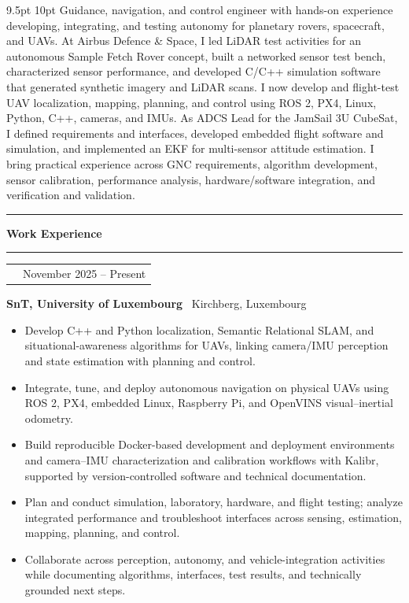 \documentclass[10pt,a4paper]{article}
\makeatletter
\newcommand{\StatementSize}{9.5pt}
\newcommand{\SectionSize}{11.5pt}
\newcommand{\RoleSize}{10.3pt}
\newcommand{\CompanySize}{9.6pt}
\newcommand{\DurationSize}{9pt}
\newcommand{\BodySize}{9.2pt}
\newcommand{\StatementLineSize}{10pt}
\newcommand{\SectionLineSize}{12pt}
\newcommand{\RoleLineSize}{11.5pt}
\newcommand{\CompanyLineSize}{10.8pt}
\newcommand{\DurationLineSize}{9pt}
\newcommand{\BodyLineSize}{11pt}
\newcommand{\HeaderAfter}{-5pt}
\newcommand{\StatementAfter}{4pt}
\newcommand{\SectionBefore}{4pt}
\newcommand{\SectionTitleToLine}{2pt}
\newcommand{\SectionLineToEntry}{0pt}
\newcommand{\EntryBefore}{0pt}
\newcommand{\RoleToCompany}{-5pt}
\newcommand{\CompanyToBullets}{3pt}
\newcommand{\EntryAfter}{6pt}
\newcommand{\BulletSpacing}{2pt}
\newcommand{\BulletBefore}{0pt}
\newcommand{\BulletIndent}{1.25em}
\newcommand{\SubsectionLineThickness}{0.4pt}
\newcommand{\CVLineThickness}{0.5pt}
\newcommand{\DurationWidth}{4.5cm}
\newcommand{\CVLine}{
    \vspace{\HeaderAfter}
    \noindent
    \textcolor{CVBlack}{
        \rule{\textwidth}{\CVLineThickness}
    }
    \vspace{\HeaderAfter}
}
\newcommand{\CVFirstSection}[1]{

    \vspace{\SectionBefore}


    {\fontsize{\SectionSize}{\SectionLineSize}
    \selectfont
    \textbf{\textcolor{CVBlack}{#1}}}

    \vspace{\SectionTitleToLine}


    \noindent
    \textcolor{CVLightGray}{
        \rule{\textwidth}{\SubsectionLineThickness}
    }

    \vspace{\SectionLineToEntry}
}
\newcommand{\CVEntry}[5]{

    \vspace{\EntryBefore}


    \noindent
    \begin{tabularx}{\textwidth}{
        @{}
        >{\raggedright\arraybackslash}X
        >{\raggedleft\arraybackslash}p{\DurationWidth}
        @{}
    }

        {\fontsize{\RoleSize}{\RoleLineSize}
        \selectfont
        \textbf{\textcolor{CVBlack}{#1}}}
        &
        {\fontsize{\DurationSize}{\DurationLineSize}
        \selectfont
        \textcolor{CVGray}{#4}}

    \end{tabularx}

    \vspace{\RoleToCompany}


    \noindent
    {\fontsize{\CompanySize}{\CompanyLineSize}
    \selectfont
    \textbf{\textcolor{CVDarkGray}{#2}}
    \textcolor{CVGray}{\textbar\ #3}}

    \vspace{\CompanyToBullets}


    \begin{itemize}[
        leftmargin=\BulletIndent,
        itemsep=\BulletSpacing,
        topsep=\BulletBefore,
        parsep=0pt,
        partopsep=0pt
    ]
        #5
    \end{itemize}

    \vspace{\EntryAfter}
}
\newcommand{\CVBullet}[1]{
    \item
    {\fontsize{\BodySize}{\BodyLineSize}
    \selectfont
    \textcolor{CVDarkGray}{#1}}
}
\makeatother
\begin{document}
{
    \fontsize
    {\StatementSize}
    {\StatementLineSize}
    \selectfont
    \textcolor{CVDarkGray}
    {
        Guidance, navigation, and control engineer with hands-on experience developing,
        integrating, and testing autonomy for planetary rovers, spacecraft, and UAVs.
        At Airbus Defence \& Space, I led LiDAR test activities for an autonomous Sample
        Fetch Rover concept, built a networked sensor test bench, characterized sensor
        performance, and developed C/C++ simulation software that generated synthetic
        imagery and LiDAR scans. I now develop and flight-test UAV localization,
        mapping, planning, and control using ROS 2, PX4, Linux, Python, C++, cameras,
        and IMUs. As ADCS Lead for the JamSail 3U CubeSat, I defined requirements and
        interfaces, developed embedded flight software and simulation, and implemented
        an EKF for multi-sensor attitude estimation. I bring practical experience
        across GNC requirements, algorithm development, sensor calibration, performance
        analysis, hardware/software integration, and verification and validation.
    }
}

\vspace{\StatementAfter}

\CVLine


\CVFirstSection{Work Experience}

\CVEntry
{Doctoral Researcher -- Autonomous UAV Systems}
{SnT, University of Luxembourg}
{Kirchberg, Luxembourg}
{November 2025 -- Present}
{
    \CVBullet{Develop C++ and Python localization, Semantic Relational SLAM, and situational-awareness algorithms for UAVs, linking camera/IMU perception and state estimation with planning and control.}

    \CVBullet{Integrate, tune, and deploy autonomous navigation on physical UAVs using ROS 2, PX4, embedded Linux, Raspberry Pi, and OpenVINS visual--inertial odometry.}

    \CVBullet{Build reproducible Docker-based development and deployment environments and camera--IMU characterization and calibration workflows with Kalibr, supported by version-controlled software and technical documentation.}

    \CVBullet{Plan and conduct simulation, laboratory, hardware, and flight testing; analyze integrated performance and troubleshoot interfaces across sensing, estimation, mapping, planning, and control.}

    \CVBullet{Collaborate across perception, autonomy, and vehicle-integration activities while documenting algorithms, interfaces, test results, and technically grounded next steps.}
}
\end{document}

